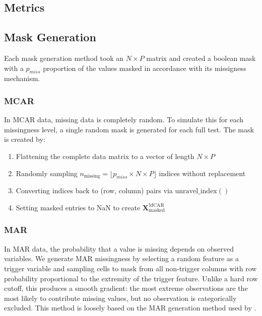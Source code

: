 \documentclass[preprint,longauthor,twocolumn]{aastex631}
\begin{document}
\subsection{Metrics}

\subsection{Mask Generation}

Each mask generation method took an $N \times P$ matrix and created a boolean mask with a $p_{miss}$ proportion of the values masked in accordance with its missigness mechanism.

\subsubsection{MCAR}

In MCAR data, missing data is completely random. To simulate this for each missingness level, a single random mask is generated for each full test. The mask is created by:

\begin{enumerate}
  \item Flattening the complete data matrix to a vector of length $N \times P$
  \item Randomly sampling $n_{\text{missing}} = \lfloor p_{miss} \times N \times P \rfloor$ indices without replacement
  \item Converting indices back to (row, column) pairs via $\text{unravel\_index}()$
  \item Setting masked entries to NaN to create $\mathbf{X}_{\text{masked}}^{\text{MCAR}}$
\end{enumerate}

\subsubsection{MAR}

In MAR data, the probability that a value is missing depends on observed variables. We generate MAR missingness by selecting a random feature as a trigger variable and sampling cells to mask from all non-trigger columns with row probability proportional to the extremity of the trigger feature. Unlike a hard row cutoff, this produces a smooth gradient: the most extreme observations are the most likely to contribute missing values, but no observation is categorically excluded. This method is loosely based on the MAR generation method used by \citet{toyeBenchmarkingMissingData2025}.
\end{document}
